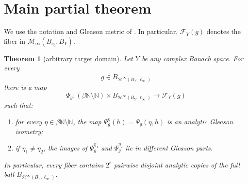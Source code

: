 \documentclass[11pt]{article}
\newtheorem{theorem}{Theorem}
\newcommand{\N}{\mathbb N}
\newcommand{\Hinf}{\mathcal H^\infty}
\newcommand{\Minf}{\mathcal M_\infty}
\newcommand{\F}{\mathscr F}
\begin{document}
\section{Main partial theorem}

We use the notation and Gleason metric of
\cite{DimantSingerFibered,DimantSingerPolydisk}.  In particular,
$\F_Y(g)$ denotes the fiber in $\Minf(B_{c_0},B_Y)$.

\begin{theorem}[arbitrary target domain]\label{thm:arbitraryY}
Let $Y$ be any complex Banach space.  For every
\[
 g\in\overline B_{\Hinf(B_Y,\ell_\infty)}
\]
there is a map
\[
 \Psi_g:(\beta\N\setminus\N)\times
 B_{\Hinf(B_Y,\ell_\infty)}\longrightarrow \F_Y(g)
\]
such that:
\begin{enumerate}[label=\textup{(\arabic*)}]
\item for every $\eta\in\beta\N\setminus\N$, the map
      $\Psi_g^\eta(h)=\Psi_g(\eta,h)$ is an analytic Gleason isometry;
\item if $\eta_1\ne\eta_2$, the images of $\Psi_g^{\eta_1}$ and
      $\Psi_g^{\eta_2}$ lie in different Gleason parts.
\end{enumerate}
In particular, every fiber contains $2^{\mathfrak c}$ pairwise disjoint
analytic copies of the full ball $B_{\Hinf(B_Y,\ell_\infty)}$.
\end{theorem}
\end{document}
